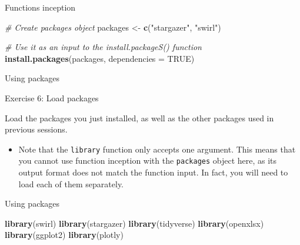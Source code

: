 \documentclass[ignorenonframetext,]{beamer}
\newenvironment{Shaded}{\begin{snugshade}}{\end{snugshade}}
\newcommand{\KeywordTok}[1]{\textcolor[rgb]{0.13,0.29,0.53}{\textbf{#1}}}
\newcommand{\DataTypeTok}[1]{\textcolor[rgb]{0.13,0.29,0.53}{#1}}
\newcommand{\StringTok}[1]{\textcolor[rgb]{0.31,0.60,0.02}{#1}}
\newcommand{\CommentTok}[1]{\textcolor[rgb]{0.56,0.35,0.01}{\textit{#1}}}
\newcommand{\OtherTok}[1]{\textcolor[rgb]{0.56,0.35,0.01}{#1}}
\newcommand{\NormalTok}[1]{#1}
\providecommand{\tightlist}{%
  \setlength{\itemsep}{0pt}\setlength{\parskip}{0pt}}
\begin{document}
\begin{frame}[fragile]{Functions inception}

\begin{Shaded}
\begin{Highlighting}[]
  \CommentTok{# Create packages object}
\NormalTok{  packages <-}\StringTok{ }\KeywordTok{c}\NormalTok{(}\StringTok{"stargazer"}\NormalTok{,}
                \StringTok{"swirl"}\NormalTok{)}

  \CommentTok{# Use it as an input to the install.packageS() function}
  \KeywordTok{install.packages}\NormalTok{(packages,}
                   \DataTypeTok{dependencies =} \OtherTok{TRUE}\NormalTok{)}
\end{Highlighting}
\end{Shaded}

\end{frame}

\begin{frame}[fragile]{Using packages}

\begin{block}{Exercise 6: Load packages}

Load the packages you just installed, as well as the other packages used
in previous sessions.

\begin{itemize}
\tightlist
\item
  Note that the \texttt{library} function only accepts one argument.
  This means that you cannot use function inception with the
  \texttt{packages} object here, as its output format does not match the
  function input. In fact, you will need to load each of them
  separately.
\end{itemize}

\end{block}

\end{frame}

\begin{frame}[fragile]{Using packages}

\begin{Shaded}
\begin{Highlighting}[]
  \KeywordTok{library}\NormalTok{(swirl)}
  \KeywordTok{library}\NormalTok{(stargazer)}
  \KeywordTok{library}\NormalTok{(tidyverse)}
  \KeywordTok{library}\NormalTok{(openxlsx)}
  \KeywordTok{library}\NormalTok{(ggplot2)}
  \KeywordTok{library}\NormalTok{(plotly)}
\end{Highlighting}
\end{Shaded}

\end{frame}
\end{document}
